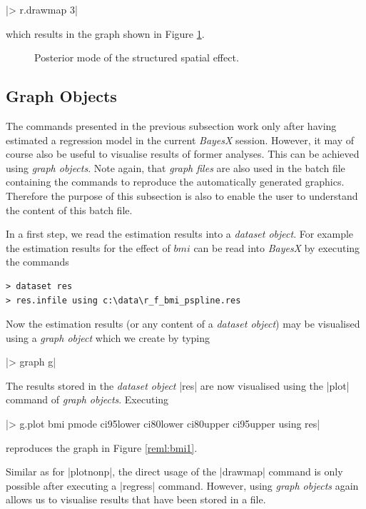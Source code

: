 |> r.drawmap 3|

which results in the graph shown in Figure \ref{reml:spat1}.

\begin{figure}[ht]
\begin{center}
{\it\caption{Posterior mode of the structured spatial
effect.\label{reml:spat1}}}
\end{center}
\end{figure}


\subsection{Graph Objects}

The commands presented in the previous subsection work only after having estimated a regression model in the current {\it
BayesX} session. However, it may of course also be useful to visualise results of former analyses. This can be achieved using
{\it graph objects}. Note again, that {\it graph files} are also used in the batch file containing the commands to reproduce
the automatically generated graphics. Therefore the purpose of this subsection is also to enable the user to understand the
content of this batch file.

In a first step, we read the estimation results into a {\it dataset object}. For example the estimation results for the effect
of $\mathit{bmi}$ can be read into {\it BayesX} by executing the commands

\begin{verbatim}
> dataset res
> res.infile using c:\data\r_f_bmi_pspline.res
\end{verbatim}

Now the estimation results (or any content of a {\it dataset object}) may be visualised using a {\it graph object} which we
create by typing

|> graph g|

The results stored in the {\it dataset object} |res| are now visualised using the |plot| command of {\it graph objects}.
Executing

 |> g.plot bmi pmode ci95lower ci80lower ci80upper ci95upper using res|

reproduces the graph in Figure \ref{reml:bmi1}.

Similar as for |plotnonp|, the direct usage of the |drawmap| command is only possible after executing a |regress| command.
However, using {\it graph objects} again allows us to visualise results that have been stored in a file.

